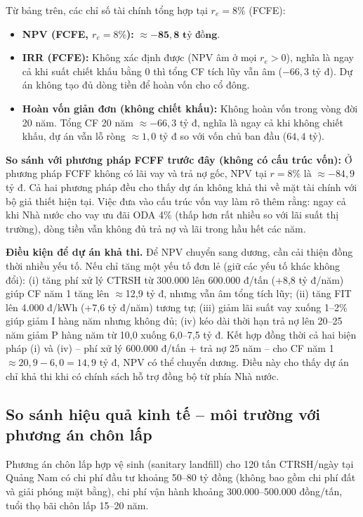 \documentclass[../main.tex]{subfiles}
\begin{document}
Từ bảng trên, các chỉ số tài chính tổng hợp tại $r_e = 8\%$ (FCFE):
\begin{itemize}
  \item \textbf{NPV (FCFE, $r_e = 8\%$):} $\approx \mathbf{-85{,}8 \text{ tỷ đồng}}$.
  \item \textbf{IRR (FCFE):} Không xác định được (NPV âm ở mọi $r_e > 0$), nghĩa là ngay cả khi suất chiết khấu bằng 0 thì tổng CF tích lũy vẫn âm ($-66{,}3$ tỷ đ). Dự án không tạo đủ dòng tiền để hoàn vốn cho cổ đông.
  \item \textbf{Hoàn vốn giản đơn (không chiết khấu):} Không hoàn vốn trong vòng đời 20 năm. Tổng CF 20 năm $\approx -66{,}3$ tỷ đ, nghĩa là ngay cả khi không chiết khấu, dự án vẫn lỗ ròng $\approx 1{,}0$ tỷ đ so với vốn chủ ban đầu ($64{,}4$ tỷ).
\end{itemize}

\textbf{So sánh với phương pháp FCFF trước đây (không có cấu trúc vốn):} Ở phương pháp FCFF không có lãi vay và trả nợ gốc, NPV tại $r = 8\%$ là $\approx -84{,}9$ tỷ đ. Cả hai phương pháp đều cho thấy dự án không khả thi về mặt tài chính với bộ giả thiết hiện tại. Việc đưa vào cấu trúc vốn vay làm rõ thêm rằng: ngay cả khi Nhà nước cho vay ưu đãi ODA 4\% (thấp hơn rất nhiều so với lãi suất thị trường), dòng tiền vẫn không đủ trả nợ và lãi trong hầu hết các năm.

\textbf{Điều kiện để dự án khả thi.} Để NPV chuyển sang dương, cần cải thiện đồng thời nhiều yếu tố. Nếu chỉ tăng một yếu tố đơn lẻ (giữ các yếu tố khác không đổi): (i) tăng phí xử lý CTRSH từ 300.000 lên 600.000 đ/tấn (+8,8 tỷ đ/năm) giúp CF năm 1 tăng lên $\approx$12,9 tỷ đ, nhưng vẫn âm tổng tích lũy; (ii) tăng FIT lên 4.000 đ/kWh (+7,6 tỷ đ/năm) tương tự; (iii) giảm lãi suất vay xuống 1--2\% giúp giảm I hàng năm nhưng không đủ; (iv) kéo dài thời hạn trả nợ lên 20--25 năm giảm P hàng năm từ 10,0 xuống 6,0--7,5 tỷ đ. Kết hợp đồng thời cả hai biện pháp (i) và (iv) -- phí xử lý 600.000 đ/tấn + trả nợ 25 năm -- cho CF năm 1 $\approx 20{,}9 - 6{,}0 = 14{,}9$ tỷ đ, NPV có thể chuyển dương. Điều này cho thấy dự án chỉ khả thi khi có chính sách hỗ trợ đồng bộ từ phía Nhà nước.

\subsection{So sánh hiệu quả kinh tế -- môi trường với phương án chôn lấp}

Phương án chôn lấp hợp vệ sinh (sanitary landfill) cho 120 tấn CTRSH/ngày tại Quảng Nam có chi phí đầu tư khoảng 50--80 tỷ đồng (không bao gồm chi phí đất và giải phóng mặt bằng), chi phí vận hành khoảng 300.000--500.000 đồng/tấn, tuổi thọ bãi chôn lấp 15--20 năm.
\end{document}
